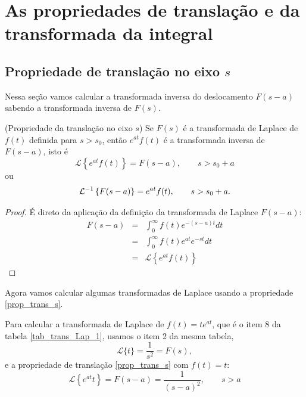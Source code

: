 \chapter{As propriedades de translação e da transformada da integral}
\section{Propriedade de translação no eixo $s$}
Nessa seção vamos calcular a transformada inversa do deslocamento $F(s-a)$ sabendo a transformada inversa de $F(s)$. %

\begin{teo}{\label{prop_trans_s}}(Propriedade da translação no eixo $s$) Se $F(s)$ é a transformada de Laplace de $f(t)$ definida para $s>s_0$, então $e^{at}f(t)$ é a transformada inversa de $F(s-a)$, isto é
\begin{equation}
\mathcal{L}\left\{e^{at}f(t)\right\} =F(s-a),\qquad s>s_0+a
\end{equation}
ou
\begin{equation}{\label{eq_trans_s_inv}}
\mathcal{L}^{-1} \left\{F(s-a)\right\} =e^{at}f(t),\qquad s>s_0+a.
\end{equation}
\end{teo}
\begin{proof}É direto da aplicação da definição da transformada de Laplace $F(s-a)$:
\begin{eqnarray*}
 F(s-a)&=&\int_0^\infty f(t)e^{-(s-a)t}dt\\
&=&\int_0^\infty f(t)e^{at}e^{-st}dt\\
&=&\mathcal{L}\left\{e^{at}f(t)\right\}
 \end{eqnarray*}
\end{proof}
Agora vamos calcular algumas transformadas de Laplace usando a propriedade \ref{prop_trans_s}.
\begin{ex}Para calcular a transformada de Laplace de $f(t)=te^{at}$, que é o item 8 da tabela \ref{tab_trans_Lap_1}, usamos o item 2 da mesma tabela,
\begin{equation}
\mathcal{L}\{t\}=\frac{1}{s^2}=F(s),
\end{equation}
e a propriedade de translação \ref{prop_trans_s} com $f(t)=t$:
\begin{equation}
\mathcal{L}\left\{e^{at}t\right\} =F(s-a)=\frac{1}{(s-a)^2},\qquad s>a
\end{equation}
\end{ex}
